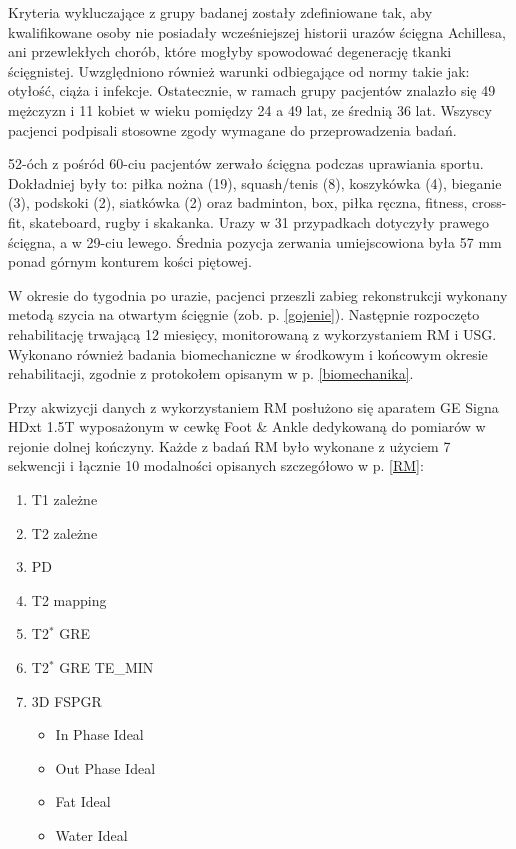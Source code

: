 Kryteria wykluczające z grupy badanej zostały zdefiniowane tak, aby kwalifikowane osoby nie posiadały wcześniejszej historii urazów ścięgna Achillesa, ani przewlekłych chorób, które mogłyby spowodować degenerację tkanki ścięgnistej. Uwzględniono również warunki odbiegające od normy takie jak: otyłość, ciąża i infekcje. Ostatecznie, w ramach grupy pacjentów znalazło się 49 mężczyzn i 11 kobiet w wieku pomiędzy 24 a 49 lat, ze średnią 36 lat. Wszyscy pacjenci podpisali stosowne zgody wymagane do przeprowadzenia badań.   

52-óch z pośród 60-ciu pacjentów zerwało ścięgna podczas uprawiania sportu. Dokładniej były to: piłka nożna (19), squash/tenis (8), koszykówka (4), bieganie (3), podskoki (2), siatkówka (2) oraz badminton, box, piłka ręczna, fitness, cross-fit, skateboard, rugby i skakanka. Urazy w 31 przypadkach dotyczyły prawego ścięgna, \linebreak a w 29-ciu lewego. Średnia pozycja zerwania umiejscowiona była 57 mm ponad górnym konturem kości piętowej.

W okresie do tygodnia po urazie, pacjenci przeszli zabieg rekonstrukcji wykonany metodą szycia na otwartym ścięgnie (zob. p. \ref{gojenie}). Następnie rozpoczęto rehabilitację trwającą 12 miesięcy, monitorowaną z wykorzystaniem RM i USG. Wykonano również badania biomechaniczne w środkowym i końcowym okresie rehabilitacji, zgodnie z protokołem opisanym w p. \ref{biomechanika}.

Przy akwizycji danych z wykorzystaniem RM posłużono się aparatem GE Signa HDxt 1.5T wyposażonym w cewkę Foot \& Ankle dedykowaną do pomiarów w rejonie dolnej kończyny. Każde z badań RM było wykonane z użyciem 7 sekwencji i łącznie 10 modalności opisanych szczegółowo w p. \ref{RM}:
\begin{enumerate}
	\item T1 zależne
	\item T2 zależne
	\item PD
	\item T2 mapping
	\item T2$^\ast$ GRE
	\item T2$^\ast$ GRE TE\_MIN
	\item 3D FSPGR
	\begin{itemize}
		\item In Phase Ideal
		\item Out Phase Ideal
		\item Fat Ideal
		\item Water Ideal 
	\end{itemize}
\end{enumerate}

